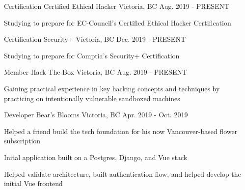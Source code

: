 


\begin{cventries}


\cventry
{Certification} %
{Certified Ethical Hacker} %
{Victoria, BC} %
{Aug. 2019 - PRESENT} %
{ %
\begin{cvitems}
\item {Studying to prepare for EC-Council's Certified Ethical Hacker Certification}
\end{cvitems}
}


\cventry
{Certification} %
{Security+} %
{Victoria, BC} %
{Dec. 2019 - PRESENT} %
{ %
\begin{cvitems}
\item {Studying to prepare for Comptia's Security+ Certification}
\end{cvitems}
}

\cventry
{Member} %
{Hack The Box} %
{Victoria, BC} %
{Aug. 2019 - PRESENT} %
{ %
\begin{cvitems}
\item {Gaining practical experience in key hacking concepts and techniques by practicing on intentionally vulnerable sandboxed machines}
\end{cvitems}
}


\cventry
{Developer} %
{Bear's Blooms} %
{Victoria, BC} %
{Apr. 2019 - Oct. 2019} %
{ %
\begin{cvitems}
\item {Helped a friend build the tech foundation for his now Vancouver-based flower subscription}
\item {Inital application built on a Postgres, Django, and Vue stack}
\item {Helped validate architecture, built authentication flow, and helped develop the initial Vue frontend}
\end{cvitems}
}


\end{cventries}

